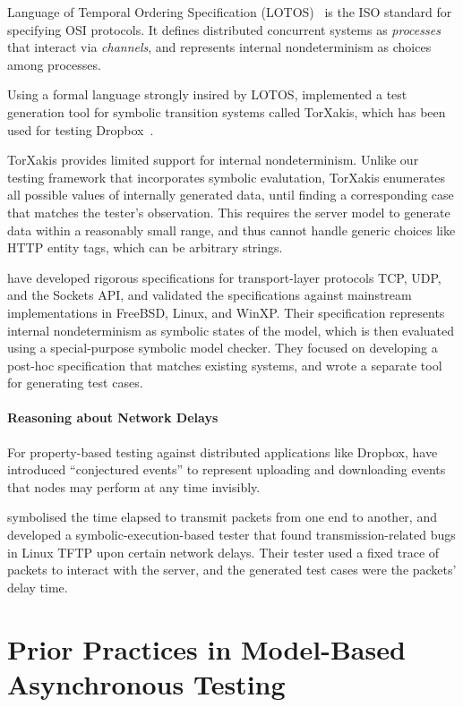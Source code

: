 \documentclass{article}
\theoremstyle{definition}
\begin{document}
Language of Temporal Ordering Specification (LOTOS)~\cite{Bolognesi1987} is the
ISO standard for specifying OSI protocols.  It defines distributed concurrent
systems as {\em processes} that interact via {\em channels}, and represents
internal nondeterminism as choices among processes.

Using a formal language strongly insired by LOTOS, \textcite{torxakis-dropbox}
implemented a test generation tool for symbolic transition systems called
TorXakis, which has been used for testing Dropbox~\cite{torxakis-dropbox}.

TorXakis provides limited support for internal nondeterminism.  Unlike our
testing framework that incorporates symbolic evalutation, TorXakis enumerates
all possible values of internally generated data, until finding a corresponding
case that matches the tester's observation.  This requires the server model to
generate data within a reasonably small range, and thus cannot handle generic
choices like HTTP entity tags, which can be arbitrary strings.

\textcite{netsem} have developed rigorous specifications for transport-layer
protocols TCP, UDP, and the Sockets API, and validated the specifications
against mainstream implementations in FreeBSD, Linux, and WinXP.  Their
specification represents internal nondeterminism as symbolic states of the
model, which is then evaluated using a special-purpose symbolic model checker.
They focused on developing a post-hoc specification that matches existing
systems, and wrote a separate tool for generating test cases.


\paragraph{Reasoning about Network Delays}
For property-based testing against distributed applications like Dropbox,
\textcite{testing-dropbox} have introduced ``conjectured events'' to represent
uploading and downloading events that nodes may perform at any time invisibly.

\textcite{pkt-dyn} symbolised the time elapsed to transmit packets from one end
to another, and developed a symbolic-execution-based tester that found
transmission-related bugs in Linux TFTP upon certain network delays.  Their
tester used a fixed trace of packets to interact with the server, and the
generated test cases were the packets' delay time.

\section{Prior Practices in Model-Based Asynchronous Testing}
\end{document}
